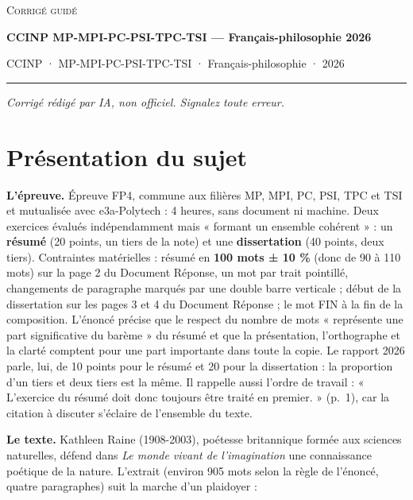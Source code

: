 \documentclass[11pt,a4paper]{article}
\begin{document}
\thispagestyle{plain}
\begin{center}
  {\small\scshape Corrigé guidé}\par\smallskip
  {\LARGE\bfseries CCINP MP-MPI-PC-PSI-TPC-TSI — Français-philosophie 2026\par}\medskip
  {\large CCINP · MP-MPI-PC-PSI-TPC-TSI · Français-philosophie · 2026\par}
\end{center}
\vspace{2pt}\hrule\vspace{8pt}

\emph{Corrigé rédigé par IA, non officiel. Signalez toute erreur.}

\hypertarget{pruxe9sentation-du-sujet}{%
\section{Présentation du sujet}\label{pruxe9sentation-du-sujet}}

\textbf{L'épreuve.} Épreuve FP4, commune aux filières MP, MPI, PC, PSI, TPC et TSI et mutualisée avec e3a-Polytech : 4 heures, sans document ni machine. Deux exercices évalués indépendamment mais « formant un ensemble cohérent » : un \textbf{résumé} (20 points, un tiers de la note) et une \textbf{dissertation} (40 points, deux tiers). Contraintes matérielles : résumé en \textbf{100 mots ± 10 \%} (donc de 90 à 110 mots) sur la page 2 du Document Réponse, un mot par trait pointillé, changements de paragraphe marqués par une double barre verticale ; début de la dissertation sur les pages 3 et 4 du Document Réponse ; le mot FIN à la fin de la composition. L'énoncé précise que le respect du nombre de mots « représente une part significative du barème » du résumé et que la présentation, l'orthographe et la clarté comptent pour une part importante dans toute la copie. Le rapport 2026 parle, lui, de 10 points pour le résumé et 20 pour la dissertation : la proportion d'un tiers et deux tiers est la même. Il rappelle aussi l'ordre de travail : « L'exercice du résumé doit donc toujours être traité en premier. » (p.~1), car la citation à discuter s'éclaire de l'ensemble du texte.

\textbf{Le texte.} Kathleen Raine (1908-2003), poétesse britannique formée aux sciences naturelles, défend dans \emph{Le monde vivant de l'imagination} une connaissance poétique de la nature. L'extrait (environ 905 mots selon la règle de l'énoncé, quatre paragraphes) suit la marche d'un plaidoyer :
\end{document}

